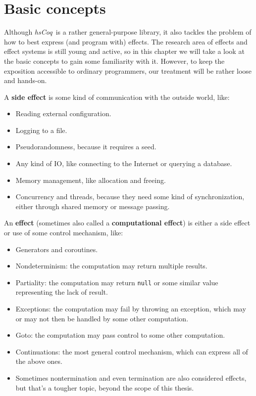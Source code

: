 \documentclass[declaration,inz,english,shortabstract]{iithesis}
\newcommand{\libname}{\textit{hsCoq}}
\newcommand{\m}[1]{\texttt{#1}}
\begin{document}
\section{Basic concepts}

Although \libname\ is a rather general-purpose library, it also tackles the problem of how to best express (and program with) effects. The research area of effects and effect systems is still young and active, so in this chapter we will take a look at the basic concepts to gain some familiarity with it. However, to keep the exposition accessible to ordinary programmers, our treatment will be rather loose and hands-on.

A \textbf{side effect} is some kind of communication with the outside world, like:

\begin{itemize}
    \item Reading external configuration.
    \item Logging to a file.
    \item Pseudorandomness, because it requires a seed.
    \item Any kind of IO, like connecting to the Internet or querying a database.
    \item Memory management, like allocation and freeing.
    \item Concurrency and threads, because they need some kind of synchronization, either through shared memory or message passing.
\end{itemize}

An \textbf{effect} (sometimes also called a \textbf{computational effect}) is either a side effect or use of some control mechanism, like:

\begin{itemize}
    \item Generators and coroutines.
    \item Nondeterminism: the computation may return multiple results.
    \item Partiality: the computation may return \m{null} or some similar value representing the lack of result.
    \item Exceptions: the computation may fail by throwing an exception, which may or may not then be handled by some other computation.
    \item Goto: the computation may pass control to some other computation.
    \item Continuations: the most general control mechanism, which can express all of the above ones.
    \item Sometimes nontermination and even termination are also considered effects, but that's a tougher topic, beyond the scope of this thesis.
\end{itemize}
\end{document}
